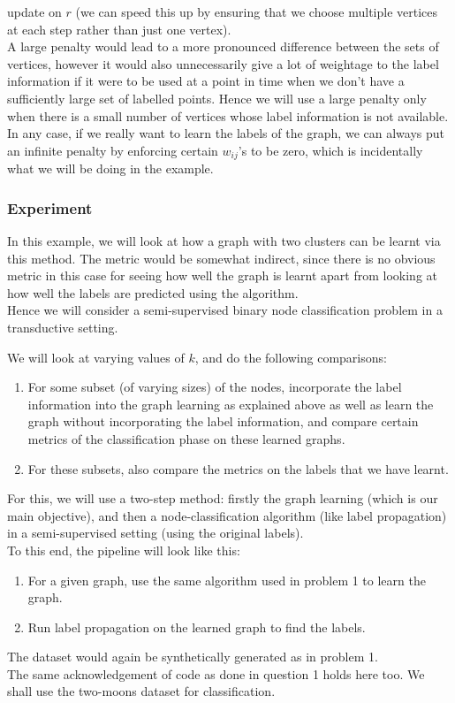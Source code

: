 \documentclass[a4paper]{article}
\newcommand{\nl}{\vspace{0.2cm}\\}
\begin{document}
update on $r$ (we can speed this up by ensuring that we choose multiple vertices at each step rather than just one vertex).\nl
A large penalty would lead to a more pronounced difference between the sets of vertices, however it would also unnecessarily give a lot of weightage to the label information if it were to be
used at a point in time when we don't have a sufficiently large set of labelled points. Hence we will use a large penalty only when there is a small number of vertices whose label information is not
available. In any case, if we really want to learn the labels of the graph, we can always put an infinite penalty by enforcing certain $w_{ij}$'s to be zero, which is incidentally what we will be
doing in the example.

\subsubsection{Experiment}

In this example, we will look at how a graph with two clusters can be learnt via this method. The metric would be somewhat indirect, since there is no obvious metric in this case for seeing how well the graph is
learnt apart from looking at how well the labels are predicted using the algorithm.\nl
Hence we will consider a semi-supervised binary node classification problem in a transductive setting.

We will look at varying values of $k$, and do the following comparisons:

\begin{enumerate}
    \item For some subset (of varying sizes) of the nodes, incorporate the label information into the graph learning as explained above as well as learn the graph without incorporating the
        label information, and compare certain metrics of the classification phase on these learned graphs.
    \item For these subsets, also compare the metrics on the labels that we have learnt.
\end{enumerate}

For this, we will use a two-step method: firstly the graph learning (which is our main objective), and then a node-classification algorithm (like label propagation) in a semi-supervised setting (using the original labels).\nl
To this end, the pipeline will look like this:
\begin{enumerate}
    \item For a given graph, use the same algorithm used in problem 1 to learn the graph.
    \item Run label propagation on the learned graph to find the labels.
\end{enumerate}
The dataset would again be synthetically generated as in problem 1.\nl
The same acknowledgement of code as done in question 1 holds here too.
We shall use the two-moons dataset for classification.\nl
\end{document}
